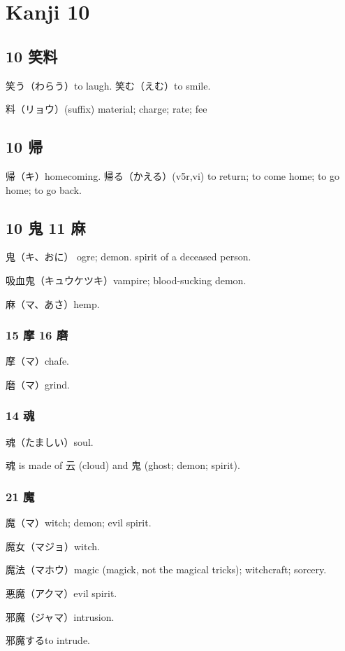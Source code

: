 \chapter{Kanji 10}

\section{10 笑料}

笑う（わらう）to laugh.
笑む（えむ）to smile.

料（リョウ）(suffix) material; charge; rate; fee

\section{10 帰}

帰（キ）homecoming.
帰る（かえる）(v5r,vi)
to return; to come home; to go home; to go back.

\section{10 鬼 11 麻}

鬼（キ、おに）
ogre; demon.
spirit of a deceased person.

吸血鬼（キュウケツキ）vampire; blood-sucking demon.

麻（マ、あさ）hemp.

\subsection{15 摩 16 磨}

摩（マ）chafe.

磨（マ）grind.

\subsection{14 魂}

魂（たましい）soul.

魂 is made of 云 (cloud) and 鬼 (ghost; demon; spirit).

\subsection{21 魔}

魔（マ）witch; demon; evil spirit.

魔女（マジョ）witch.

魔法（マホウ）magic (magick, not the magical tricks); witchcraft; sorcery.

悪魔（アクマ）evil spirit.

邪魔（ジャマ）intrusion.

邪魔するto intrude.
